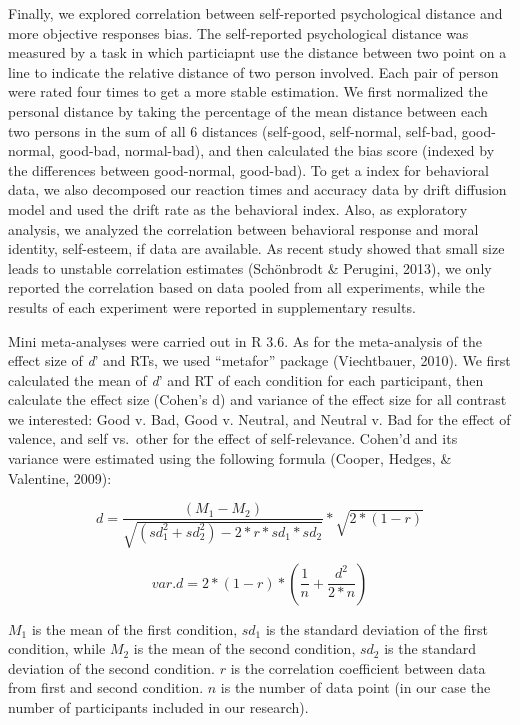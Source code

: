 \documentclass[
  man]{apa6}
\begin{document}
Finally, we explored correlation between self-reported psychological distance and more objective responses bias. The self-reported psychological distance was measured by a task in which particiapnt use the distance between two point on a line to indicate the relative distance of two person involved. Each pair of person were rated four times to get a more stable estimation. We first normalized the personal distance by taking the percentage of the mean distance between each two persons in the sum of all 6 distances (self-good, self-normal, self-bad, good-normal, good-bad, normal-bad), and then calculated the bias score (indexed by the differences between good-normal, good-bad). To get a index for behavioral data, we also decomposed our reaction times and accuracy data by drift diffusion model and used the drift rate as the behavioral index. Also, as exploratory analysis, we analyzed the correlation between behavioral response and moral identity, self-esteem, if data are available. As recent study showed that small size leads to unstable correlation estimates (Schönbrodt \& Perugini, 2013), we only reported the correlation based on data pooled from all experiments, while the results of each experiment were reported in supplementary results.

Mini meta-analyses were carried out in R 3.6. As for the meta-analysis of the effect size of \emph{d}' and RTs, we used \enquote{metafor} package (Viechtbauer, 2010). We first calculated the mean of \emph{d}' and RT of each condition for each participant, then calculate the effect size (Cohen's d) and variance of the effect size for all contrast we interested: Good v. Bad, Good v. Neutral, and Neutral v. Bad for the effect of valence, and self vs.~other for the effect of self-relevance. Cohen'd and its variance were estimated using the following formula (Cooper, Hedges, \& Valentine, 2009):

\[d = \frac {(M_{1} - M_{2})}{\sqrt {(sd_{1}^2 + sd_{2}^2) - 2*r*sd_{1}*sd_{2}}} * \sqrt {2*(1-r)}\]

\[var.d = 2*(1-r) * (\frac{1}{n} + \frac{d^2}{2*n})\]

\(M_1\) is the mean of the first condition, \(sd_1\) is the standard deviation of the first condition, while \(M_2\) is the mean of the second condition, \(sd_2\) is the standard deviation of the second condition. \(r\) is the correlation coefficient between data from first and second condition. \(n\) is the number of data point (in our case the number of participants included in our research).
\end{document}
